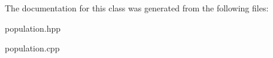 \-The documentation for this class was generated from the following files\-:\begin{DoxyCompactItemize}
\item 
population.\-hpp\item 
population.\-cpp\end{DoxyCompactItemize}
